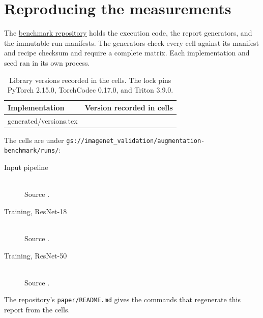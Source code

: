 \documentclass[11pt]{article}
\makeatletter
\let\inputrows\@@input
\newcommand{\repo}{\href{https://github.com/albumentations-team/benchmark}{benchmark repository}}
\makeatother
\begin{document}
\clearpage
\section{Reproducing the measurements}
\label{app:reproduce}

The \repo{} holds the execution code, the report generators, and the immutable run manifests.
The generators check every cell against its manifest and recipe checksum and require a complete
matrix. Each implementation and seed ran in its own process.

\begin{table}[H]
\centering\small
{}
\begin{tabular}{ll}
\textbf{Implementation} & \textbf{Version recorded in cells} \\ \midrule
\inputrows generated/versions.tex
\bottomrule
\end{tabular}
\caption{Library versions recorded in the cells. The lock pins PyTorch 2.15.0, TorchCodec 0.17.0,
and Triton 3.9.0.}
\end{table}

The cells are under \nolinkurl{gs://imagenet_validation/augmentation-benchmark/runs/}:

\begin{description}
\item[Input pipeline] \texttt{\expandafter\seqsplit\expandafter{\FullRunID}}\\
  Source \texttt{\FullSourceRevision}.
\item[Training, ResNet-18] \texttt{\expandafter\seqsplit\expandafter{\TrainRunIDResNetEighteen}}\\
  Source \texttt{\TrainSourceResNetEighteen}.
\item[Training, ResNet-50] \texttt{\expandafter\seqsplit\expandafter{\TrainRunIDResNetFifty}}\\
  Source \texttt{\TrainSourceResNetFifty}.
\end{description}

The repository's \texttt{paper/README.md} gives the commands that regenerate this report from the
cells.
\end{document}
